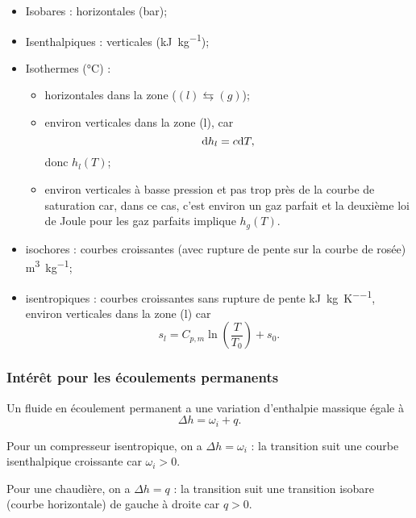             \begin{itemize}
                \item Isobares : horizontales (\si[]{\bar});
                \item Isenthalpiques : verticales (\si[]{\kilo\joule\per\kilogram});
                \item Isothermes (\si[]{\celsius}) : 
                \begin{itemize}
                    \item horizontales dans la zone ($(l)\leftrightarrows (g)$);
                    \item environ verticales dans la zone (l), car
                    \begin{equation}
                        \mathrm{d} h_l=c\mathrm{d} T,
                    \end{equation}
                    donc $h_l(T)$;
                    \item environ verticales à basse pression et pas trop près de la courbe de saturation car, dans ce cas, c'est environ un gaz parfait et la deuxième loi de Joule pour les gaz parfaits implique $h_g(T)$.
                \end{itemize}
                \item isochores : courbes croissantes (avec rupture de pente sur la courbe de rosée) \si[]{\metre\cubed\per\kilogram};
                \item isentropiques : courbes croissantes sans rupture de pente \si[]{\kilo\joule\per\kilogram\per\kelvin}, environ verticales dans la zone (l) car 
                \begin{equation}
                    s_l=C_{p,m}\ln\left(\frac{T}{T_0}\right)+s_0.
                \end{equation}
            \end{itemize}

        \subsubsection{Intérêt pour les écoulements permanents}

            Un fluide en écoulement permanent a une variation d'enthalpie massique égale à 
            \begin{equation}
                \Delta h=\omega_i+q.
            \end{equation}
            \begin{example}
                Pour un compresseur isentropique, on a $\Delta h=\omega_i$ : la transition suit une courbe isenthalpique croissante car $\omega_i>0$.
            \end{example}
            \begin{example}
                Pour une chaudière, on a $\Delta h=q$ : la transition suit une transition isobare (courbe horizontale) de gauche à droite car $q>0$.
            \end{example}

